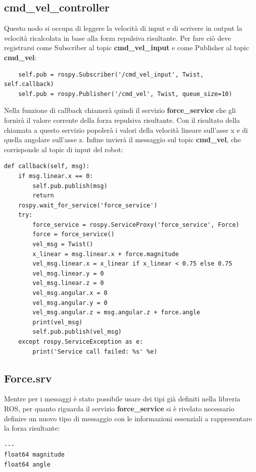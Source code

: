 \documentclass[Lau, binding=0.6cm, oneside]{sapthesis}
\begin{document}
\subsection{cmd\_vel\_controller}
Questo nodo si occupa di leggere la velocità di input e di scrivere in output la velocità ricalcolata in base alla forza repulsiva risultante.
Per fare ciò deve registrarsi come Subscriber al topic \textbf{cmd\_vel\_input} e come Publisher al topic \textbf{cmd\_vel}:

\begin{lstlisting}
    self.pub = rospy.Subscriber('/cmd_vel_input', Twist, self.callback)
    self.pub = rospy.Publisher('/cmd_vel', Twist, queue_size=10)
\end{lstlisting}

Nella funzione di callback chiamerà quindi il servizio \textbf{force\_service} che gli fornirà il valore corrente della forza repulsiva risultante.
Con il risultato della chiamata a questo servizio popolerà i valori della velocità lineare sull'asse x e di quella angolare sull'asse z.
Infine invierà il messaggio sul topic \textbf{cmd\_vel}, che corrisponde al topic di input del robot:

\begin{lstlisting}
def callback(self, msg):
    if msg.linear.x == 0:
        self.pub.publish(msg)
        return
    rospy.wait_for_service('force_service')
    try:
        force_service = rospy.ServiceProxy('force_service', Force)
        force = force_service()
        vel_msg = Twist()
        x_linear = msg.linear.x + force.magnitude
        vel_msg.linear.x = x_linear if x_linear < 0.75 else 0.75
        vel_msg.linear.y = 0
        vel_msg.linear.z = 0
        vel_msg.angular.x = 0
        vel_msg.angular.y = 0
        vel_msg.angular.z = msg.angular.z + force.angle
        print(vel_msg)
        self.pub.publish(vel_msg)
    except rospy.ServiceException as e:
        print('Service call failed: %s' %e)
\end{lstlisting}

\subsection{Force.srv}
Mentre per i messaggi è stato possibile usare dei tipi già definiti nella libreria ROS, per quanto riguarda il servizio \textbf{force\_service} si è rivelato necessario definire un nuovo tipo di messaggio con le informazioni essenziali a rappresentare la forza risultante:

\begin{lstlisting}
---
float64 magnitude
float64 angle
\end{lstlisting}
\end{document}
